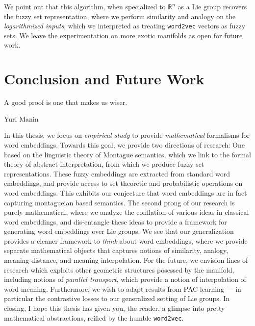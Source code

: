 \documentclass[11pt]{book}
\begin{document}
We point out that this algorithm, when specialized to $\mathbb R^n$ as a Lie
group recovers the fuzzy set representation, where we perform similarity and
analogy on the \emph{logarithmized inputs}, which we interpreted as treating
\texttt{word2vec} vectors as fuzzy sets. We leave the experimentation on more
exotic manifolds as open for future work.


\chapter{Conclusion and Future Work}

\epigraph{A good proof is one that makes us wiser.}{Yuri Manin}

In this thesis, we focus on \emph{empirical study} to provide
\emph{mathematical} formalisms for word embeddings. Towards this goal, we
provide two directions of research: One based on the linguistic theory of
Montague semantics, which we link to the formal theory of abstract
interpretation, from which we produce fuzzy set representations. These fuzzy
embeddings are extracted from standard word embeddings, and provide access to
set theoretic and probabilistic operations on word embeddings. This exhibits
our conjecture that word embeddings are in fact capturing montagueian based
semantics. The second prong of our research is purely mathematical, where we
analyze the conflation of various ideas in classical word embeddings, and
dis-entangle these ideas to provide a framework for generating word embeddings
over Lie groups.  We see that our generalization provides a cleaner framework
to \emph{think} about word embeddings, where we provide separate mathematical
objects that captures notions of similarity, analogy, meaning distance, and
meaning interpolation.  For the future, we envision lines of research which
exploits other geometric structures posessed by the manifold, including notions
of \emph{parallel transport}, which provide a notion of interpolation of word
meaning. Furthermore, we wish to adapt results from PAC learning --- in
particular the contrastive losses \cite{arora2019theoretical} to our
generalized setting of Lie groups.  In closing, I hope this thesis has given
you, the reader, a glimpse into pretty mathematical abstractions, reified by
the humble \texttt{word2vec}.
\end{document}
